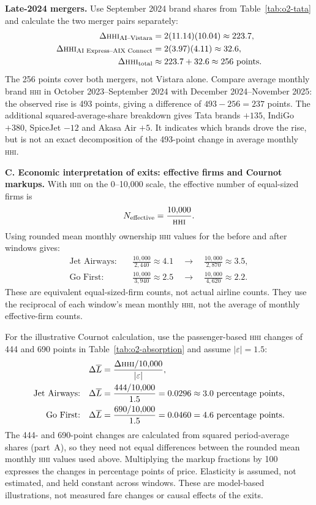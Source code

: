 \documentclass[12pt,a4paper]{article}
\newcommand{\HHI}{\textnormal{\textsc{hhi}}}
\newenvironment{mycontribution}{\par\color{blue}\captionsetup{font+={color=blue}}}{\par}
\begin{document}
\begin{mycontribution}
\textbf{Late-2024 mergers.} Use September 2024 brand shares from Table~\ref{tab:o2-tata} and calculate the two merger pairs separately:
\[
\begin{aligned}
\Delta\HHI_{\text{AI--Vistara}} &= 2(11.14)(10.04) \approx 223.7,\\
\Delta\HHI_{\text{AI Express--AIX Connect}} &= 2(3.97)(4.11) \approx 32.6,\\
\Delta\HHI_{\text{total}} &\approx 223.7+32.6 \approx 256\text{ points}.
\end{aligned}
\]
The 256 points cover both mergers, not Vistara alone. Compare average monthly brand \HHI{} in October 2023--September 2024 with December 2024--November 2025: the observed rise is 493 points, giving a difference of $493-256=237$ points. The additional squared-average-share breakdown gives Tata brands $+135$, IndiGo $+380$, SpiceJet $-12$ and Akasa Air $+5$. It indicates which brands drove the rise, but is not an exact decomposition of the 493-point change in average monthly \HHI{}.

\textbf{C. Economic interpretation of exits: effective firms and Cournot markups.}
With \HHI{} on the 0--10,000 scale, the effective number of equal-sized firms is
\[
N_{\text{effective}}=\frac{10{,}000}{\HHI}.
\]
Using rounded mean monthly ownership \HHI{} values for the before and after windows gives:
\[
\begin{aligned}
\text{Jet Airways:}\quad &\frac{10{,}000}{2{,}440}\approx4.1
\quad\longrightarrow\quad\frac{10{,}000}{2{,}870}\approx3.5,\\
\text{Go First:}\quad &\frac{10{,}000}{3{,}940}\approx2.5
\quad\longrightarrow\quad\frac{10{,}000}{4{,}620}\approx2.2.
\end{aligned}
\]
These are equivalent equal-sized-firm counts, not actual airline counts. They use the reciprocal of each window's mean monthly \HHI{}, not the average of monthly effective-firm counts.

For the illustrative Cournot calculation, use the passenger-based \HHI{} changes of 444 and 690 points in Table~\ref{tab:o2-absorption} and assume $|\varepsilon|=1.5$:
\[
\begin{aligned}
\Delta\overline{L}&=\frac{\Delta\HHI/10{,}000}{|\varepsilon|},\\
\text{Jet Airways:}\quad \Delta\overline{L}&=\frac{444/10{,}000}{1.5}
=0.0296\approx3.0\text{ percentage points},\\
\text{Go First:}\quad \Delta\overline{L}&=\frac{690/10{,}000}{1.5}
=0.0460=4.6\text{ percentage points}.
\end{aligned}
\]
The 444- and 690-point changes are calculated from squared period-average shares (part~A), so they need not equal differences between the rounded mean monthly \HHI{} values used above. Multiplying the markup fractions by 100 expresses the changes in percentage points of price. Elasticity is assumed, not estimated, and held constant across windows. These are model-based illustrations, not measured fare changes or causal effects of the exits.

\end{mycontribution}
\end{document}
